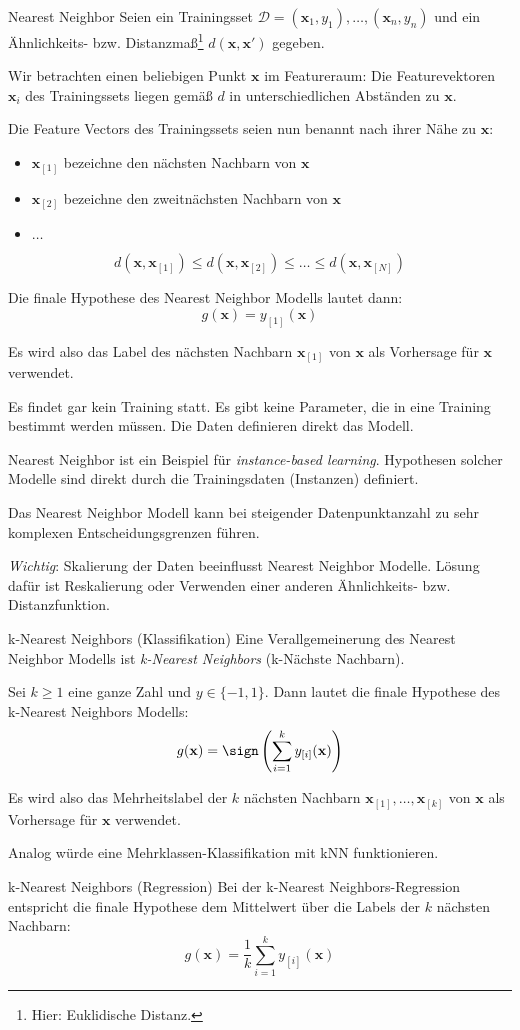 \begin{defi}{Nearest Neighbor}
    Seien ein Trainingsset $\mathcal{D} = (\mathbf{x}_1, y_1), \ldots, (\mathbf{x}_n, y_n)$ und ein Ähnlichkeits- bzw. Distanzmaß\footnote{Hier: Euklidische Distanz.} $d(\mathbf{x}, \mathbf{x}')$ gegeben.

    Wir betrachten einen beliebigen Punkt $\mathbf{x}$ im Featureraum:
    Die Featurevektoren $\mathbf{x}_i$ des Trainingssets liegen gemäß $d$ in unterschiedlichen Abständen zu $\mathbf{x}$.

    Die Feature Vectors des Trainingssets seien nun benannt nach ihrer Nähe zu $\mathbf{x}$:
    \begin{itemize}
        \item $\mathbf{x}_{[1]}$ bezeichne den nächsten Nachbarn von $\mathbf{x}$
        \item $\mathbf{x}_{[2]}$ bezeichne den zweitnächsten Nachbarn von $\mathbf{x}$
        \item $\ldots$
    \end{itemize}

    \[
        d(\mathbf{x}, \mathbf{x}_{[1]}) \leq d(\mathbf{x}, \mathbf{x}_{[2]}) \leq \ldots \leq d(\mathbf{x}, \mathbf{x}_{[N]})
    \]

    Die finale Hypothese des Nearest Neighbor Modells lautet dann:
    \[
        g(\mathbf{x}) = y_{[1]}(\mathbf{x})
    \]

    Es wird also das Label des nächsten Nachbarn $\mathbf{x}_{[1]}$ von $\mathbf{x}$ als Vorhersage für $\mathbf{x}$ verwendet.

    Es findet gar kein Training statt.
    Es gibt keine Parameter, die in eine Training bestimmt werden müssen.
    Die Daten definieren direkt das Modell.

    Nearest Neighbor ist ein Beispiel für \emph{instance-based learning}.
    Hypothesen solcher Modelle sind direkt durch die Trainingsdaten (Instanzen) definiert.

    Das Nearest Neighbor Modell kann bei steigender Datenpunktanzahl zu sehr komplexen Entscheidungsgrenzen führen.

    \emph{Wichtig}: Skalierung der Daten beeinflusst Nearest Neighbor Modelle.
    Lösung dafür ist Reskalierung oder Verwenden einer anderen Ähnlichkeits- bzw. Distanzfunktion.
\end{defi}

\begin{defi}{k-Nearest Neighbors (Klassifikation)}
    Eine Verallgemeinerung des Nearest Neighbor Modells ist \emph{k-Nearest Neighbors} (k-Nächste Nachbarn).

    Sei $k \geq 1$ eine ganze Zahl und $y \in \{ -1, 1 \}$.
    Dann lautet die finale Hypothese des k-Nearest Neighbors Modells:
    \[
        g(\mathbf{x}) = \sign \left( \sum_{i=1}^k y_{[i]}(\mathbf{x}) \right)
    \]

    Es wird also das Mehrheitslabel der $k$ nächsten Nachbarn $\mathbf{x}_{[1]}, \ldots, \mathbf{x}_{[k]}$ von $\mathbf{x}$ als Vorhersage für $\mathbf{x}$ verwendet.

    Analog würde eine Mehrklassen-Klassifikation mit kNN funktionieren.
\end{defi}

\begin{defi}{k-Nearest Neighbors (Regression)}
    Bei der k-Nearest Neighbors-Regression entspricht die finale Hypothese dem Mittelwert über die Labels der $k$ nächsten Nachbarn:
    \[
        g(\mathbf{x}) = \frac{1}{k} \sum_{i=1}^k y_{[i]}(\mathbf{x})
    \]
\end{defi}
